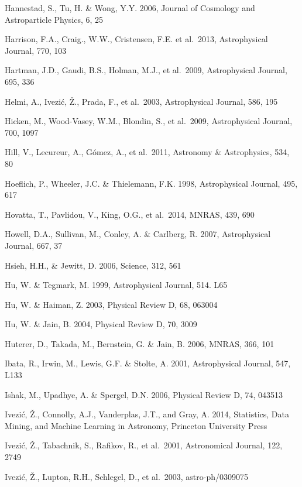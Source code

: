 \documentclass{emulateapj}
\begin{document}
\begin{thebibliography}{}
\bibitem[()]{} Hannestad, S., Tu, H. \& Wong, Y.Y. 2006, Journal of Cosmology and Astroparticle
             Physics, 6, 25

\bibitem[()]{} Harrison, F.A., Craig., W.W., Cristensen, F.E. et
  al.~2013, Astrophysical Journal, 770, 103

\bibitem[()]{} Hartman, J.D., Gaudi, B.S., Holman, M.J., et al.~2009, Astrophysical Journal, 695, 336

\bibitem[()]{} Helmi, A., Ivezi\'{c}, \v{Z}., Prada, F., et al.~2003, Astrophysical Journal, 586, 195

\bibitem[()]{} Hicken, M., Wood-Vasey, W.M., Blondin, S., et al.~2009, Astrophysical Journal, 700, 1097

\bibitem[()]{} Hill, V., Lecureur, A., G{\'o}mez, A., et al.~2011, Astronomy \& Astrophysics, 534, 80

\bibitem[()]{} Hoeflich, P., Wheeler, J.C. \& Thielemann, F.K. 1998, Astrophysical Journal, 495, 617

\bibitem[()]{} Hovatta, T., Pavlidou, V., King, O.G., et al.~2014, MNRAS, 439, 690

\bibitem[()]{} Howell, D.A., Sullivan, M., Conley, A. \& Carlberg, R. 2007, Astrophysical Journal, 667, 37

\bibitem[()]{} Hsieh, H.H., \& Jewitt, D. 2006, Science, 312, 561

\bibitem[()]{} Hu, W. \& Tegmark, M. 1999, Astrophysical Journal, 514. L65

\bibitem[()]{} Hu, W. \& Haiman, Z. 2003, Physical Review D, 68, 063004

\bibitem[()]{} Hu, W. \& Jain, B. 2004, Physical Review D, 70, 3009

\bibitem[()]{} Huterer, D., Takada, M., Bernstein, G. \& Jain, B. 2006, MNRAS, 366, 101

\bibitem[()]{} Ibata, R., Irwin, M., Lewis, G.F. \& Stolte, A. 2001, Astrophysical Journal, 547, L133

\bibitem[()]{} Ishak, M., Upadhye, A. \& Spergel, D.N. 2006, Physical Review D, 74, 043513

\bibitem[()]{} Ivezi\'c, \v Z., Connolly, A.J., Vanderplas, J.T., and
  Gray, A. 2014, Statistics, Data Mining, and Machine Learning in
  Astronomy, Princeton University Press

\bibitem[()]{} Ivezi\'{c}, \v{Z}., Tabachnik, S., Rafikov, R., et al.~2001, Astronomical Journal, 122, 2749

\bibitem[()]{} Ivezi\'c, \v Z., Lupton, R.H., Schlegel, D., et al.~2003, astro-ph/0309075


\end{thebibliography}
\end{document}
